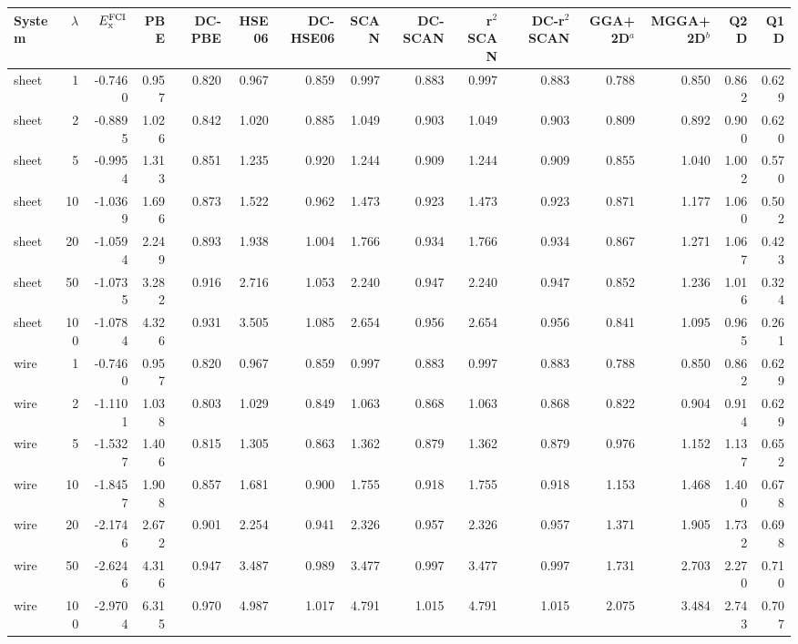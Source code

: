\begin{tabular}{lrrrrrrrrrrrrrr}
\toprule
System & $\lambda$ & $E_{\rm x}^{\rm FCI}$ & PBE & DC-PBE & HSE06 & DC-HSE06 & SCAN & DC-SCAN & r$^2$SCAN & DC-r$^2$SCAN & GGA+2D$^a$ & MGGA+2D$^b$ & Q2D & Q1D \\
\midrule
sheet & 1 & -0.7460 & 0.957 & 0.820 & 0.967 & 0.859 & 0.997 & 0.883 & 0.997 & 0.883 & 0.788 & 0.850 & 0.862 & 0.629 \\
sheet & 2 & -0.8895 & 1.026 & 0.842 & 1.020 & 0.885 & 1.049 & 0.903 & 1.049 & 0.903 & 0.809 & 0.892 & 0.900 & 0.620 \\
sheet & 5 & -0.9954 & 1.313 & 0.851 & 1.235 & 0.920 & 1.244 & 0.909 & 1.244 & 0.909 & 0.855 & 1.040 & 1.002 & 0.570 \\
sheet & 10 & -1.0369 & 1.696 & 0.873 & 1.522 & 0.962 & 1.473 & 0.923 & 1.473 & 0.923 & 0.871 & 1.177 & 1.060 & 0.502 \\
sheet & 20 & -1.0594 & 2.249 & 0.893 & 1.938 & 1.004 & 1.766 & 0.934 & 1.766 & 0.934 & 0.867 & 1.271 & 1.067 & 0.423 \\
sheet & 50 & -1.0735 & 3.282 & 0.916 & 2.716 & 1.053 & 2.240 & 0.947 & 2.240 & 0.947 & 0.852 & 1.236 & 1.016 & 0.324 \\
sheet & 100 & -1.0784 & 4.326 & 0.931 & 3.505 & 1.085 & 2.654 & 0.956 & 2.654 & 0.956 & 0.841 & 1.095 & 0.965 & 0.261 \\
\midrule
wire & 1 & -0.7460 & 0.957 & 0.820 & 0.967 & 0.859 & 0.997 & 0.883 & 0.997 & 0.883 & 0.788 & 0.850 & 0.862 & 0.629 \\
wire & 2 & -1.1101 & 1.038 & 0.803 & 1.029 & 0.849 & 1.063 & 0.868 & 1.063 & 0.868 & 0.822 & 0.904 & 0.914 & 0.629 \\
wire & 5 & -1.5327 & 1.406 & 0.815 & 1.305 & 0.863 & 1.362 & 0.879 & 1.362 & 0.879 & 0.976 & 1.152 & 1.137 & 0.652 \\
wire & 10 & -1.8457 & 1.908 & 0.857 & 1.681 & 0.900 & 1.755 & 0.918 & 1.755 & 0.918 & 1.153 & 1.468 & 1.400 & 0.678 \\
wire & 20 & -2.1746 & 2.672 & 0.901 & 2.254 & 0.941 & 2.326 & 0.957 & 2.326 & 0.957 & 1.371 & 1.905 & 1.732 & 0.698 \\
wire & 50 & -2.6246 & 4.316 & 0.947 & 3.487 & 0.989 & 3.477 & 0.997 & 3.477 & 0.997 & 1.731 & 2.703 & 2.270 & 0.710 \\
wire & 100 & -2.9704 & 6.315 & 0.970 & 4.987 & 1.017 & 4.791 & 1.015 & 4.791 & 1.015 & 2.075 & 3.484 & 2.743 & 0.707 \\
\bottomrule
\end{tabular}
